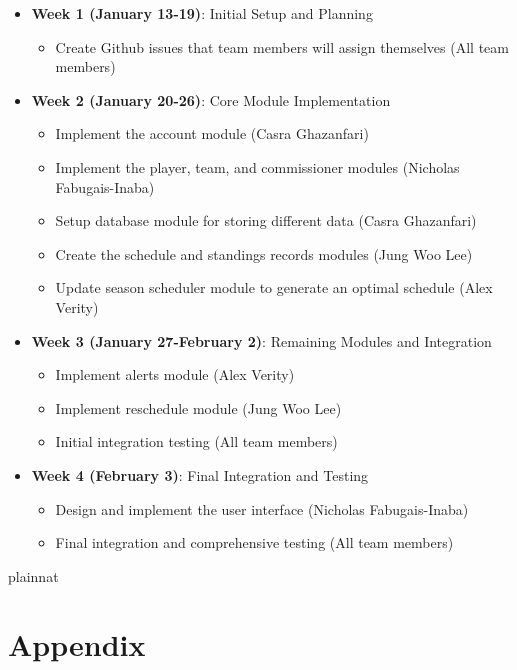 \documentclass[12pt, titlepage]{article}
\begin{document}
\begin{itemize}
  \item \textbf{Week 1 (January 13-19)}: Initial Setup and Planning
    \begin{itemize}
      \item Create Github issues that team members will assign themselves
      (All team members)
    \end{itemize}
  \item \textbf{Week 2 (January 20-26)}: Core Module Implementation
    \begin{itemize}
      \item Implement the account module (Casra Ghazanfari)
      \item Implement the player, team, and commissioner modules (Nicholas Fabugais-Inaba)
      \item Setup database module for storing different data (Casra Ghazanfari)
      \item Create the schedule and standings records modules (Jung Woo Lee)
      \item Update season scheduler module to generate an optimal schedule (Alex Verity)
    \end{itemize}
  \item \textbf{Week 3 (January 27-February 2)}: Remaining Modules and Integration
    \begin{itemize}
      \item Implement alerts module (Alex Verity)
      \item Implement reschedule module (Jung Woo Lee)
      \item Initial integration testing (All team members)
    \end{itemize}
  \item \textbf{Week 4 (February 3)}: Final Integration and Testing
    \begin{itemize}
      \item Design and implement the user interface (Nicholas Fabugais-Inaba)
      \item Final integration and comprehensive testing (All team members)
    \end{itemize}
\end{itemize}

 {plainnat}


\newpage{}

\section{Appendix} \label{Appendix}
\end{document}
